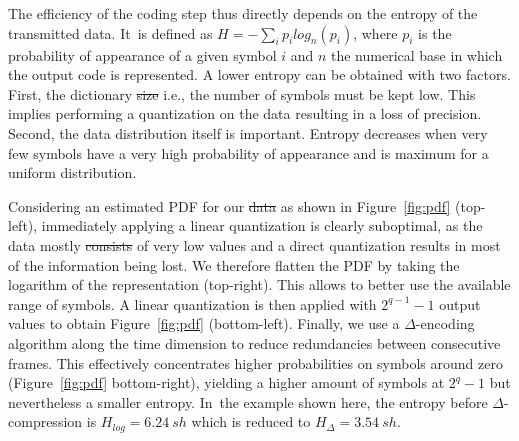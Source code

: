 \documentclass[sensors,article,accept,moreauthors,pdftex,10pt,a4paper]{mdpi}
\providecommand{\DIFaddtex}[1]{{\protect\color{blue}\uwave{#1}}} %
\providecommand{\DIFdeltex}[1]{{\protect\color{red}\sout{#1}}}                      %
\providecommand{\DIFaddbegin}{} %
\providecommand{\DIFaddend}{} %
\providecommand{\DIFdelbegin}{} %
\providecommand{\DIFdelend}{} %
\providecommand{\DIFadd}[1]{\texorpdfstring{\DIFaddtex{#1}}{#1}} %
\providecommand{\DIFdel}[1]{\texorpdfstring{\DIFdeltex{#1}}{}} %
\begin{document}
The efficiency of the coding step thus directly depends on the entropy of the transmitted data. It~is defined as $H = -\sum\limits_i p_ilog_n(p_i)$, where $p_i$ is the probability of appearance of a given symbol $i$ and $n$ \DIFaddbegin {\DIFadd{is}} \DIFaddend the numerical base in which the output code is represented. A lower entropy can be obtained with two factors. First, the dictionary \DIFdelbegin \DIFdel{size }\DIFdelend \DIFaddbegin {\DIFadd{size,}} \DIFaddend i.e., the number of symbols must be kept low. This implies performing a quantization on the data resulting in a loss of precision. Second, the data distribution itself is important. Entropy decreases when very few symbols have a very high probability of appearance and is maximum for a uniform distribution.

Considering an estimated PDF for our \DIFdelbegin \DIFdel{data }\DIFdelend \DIFaddbegin {\DIFadd{data,}} \DIFaddend as shown in Figure~\ref{fig:pdf} (top-left), immediately applying a linear quantization is clearly suboptimal, as the data mostly \DIFdelbegin \DIFdel{consists }\DIFdelend \DIFaddbegin {\DIFadd{consist}} \DIFaddend of very low values and a direct quantization results in most of the information being lost. We therefore flatten the PDF by taking the logarithm of the representation (top-right). This allows to better use the available range of symbols. A linear quantization is then applied with $2^{q-1}-1$ output values to obtain Figure~\ref{fig:pdf} (bottom-left). Finally, we use a $\Delta$-encoding algorithm along the time dimension to reduce redundancies between consecutive frames. This effectively concentrates higher probabilities on symbols around zero (Figure~\ref{fig:pdf} bottom-right), yielding a higher amount of symbols at $2^q-1$ but nevertheless a smaller entropy. In~the example shown here, the entropy before $\Delta$-compression is $H_{log} = 6.24~sh$ which is reduced to $H_{\Delta} = 3.54~sh$.
\vspace{-6pt}
\end{document}

